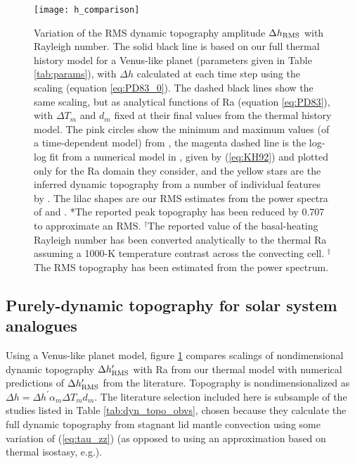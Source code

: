 \begin{figure}
  \centering
  \texttt{[image: h\_comparison]}
\caption{Variation of the RMS dynamic topography amplitude $\Delta h_{\rm RMS}$ with Rayleigh number. The solid black line is based on our full thermal history model for a Venus-like planet (parameters given in Table \ref{tab:params}), with $\Delta h$ calculated at each time step using the \citet{Parsons1983} scaling (equation \ref{eq:PD83_0}). The dashed black lines show the same scaling, but as analytical functions of Ra (equation \ref{eq:PD83}), with $\Delta T_m$ and $d_m$ fixed at their final values from the thermal history model. The pink circles show the minimum and maximum values (of a time-dependent model) from \citet{Kiefer1998}, the magenta dashed line is the log-log fit from a numerical model in \citet{Kiefer1992}, given by (\ref{eq:KH92}) and plotted only for the Ra domain they consider, and the yellow stars are the inferred dynamic topography from a number of individual features by \citet{Nimmo1996}. The lilac shapes are our RMS estimates from the power spectra of \citet{Huang2013} and \citet{Yang2016}. \;\; *The reported peak topography has been reduced by 0.707 to approximate an RMS. \;\; $^\dagger$The reported value of the basal-heating Rayleigh number has been converted analytically to the thermal Ra assuming a 1000-K temperature contrast across the convecting cell. \;\; $^\ddagger$The RMS topography has been estimated from the power spectrum.}
\label{fig:RMS_benchmark}
\end{figure}


\subsection{Purely-dynamic topography for solar system analogues}\label{sec:results-comparison}


Using a Venus-like planet model, figure \ref{fig:RMS_benchmark} compares scalings of nondimensional dynamic topography $\Delta h^\prime_{\rm RMS}$ with Ra from our thermal model with numerical predictions of $\Delta h^\prime_{\rm RMS}$ from the literature. Topography is nondimensionalized as $\Delta h = \Delta h^\prime \alpha_m \Delta T_m d_m$. The literature selection included here is subsample of the studies listed in Table \ref{tab:dyn_topo_obvs}, chosen because they calculate the full dynamic topography from stagnant lid mantle convection using some variation of (\ref{eq:tau_zz}) (as opposed to using an approximation based on thermal isostasy, e.g.).

